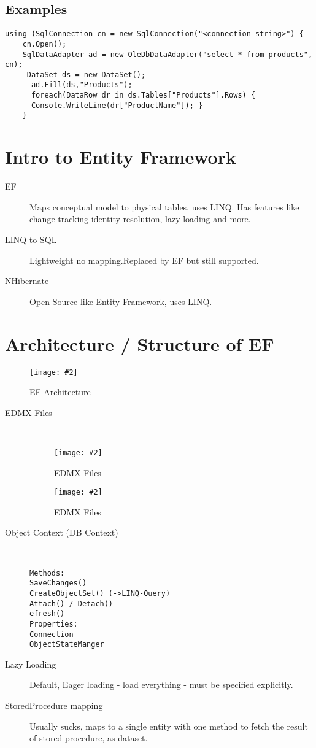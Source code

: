 \documentclass[a4paper,10pt]{scrreprt}
\newcommand{\pic}[2][figure]{\begin{figure}[h]
 \centering
 \texttt{[image: \#2]}
 \caption{#1}
\end{figure}
}
\begin{document}
\subsection{Examples}
\begin{lstlisting}[caption=DataSet Example]
using (SqlConnection cn = new SqlConnection("<connection string>") { 
	cn.Open(); 
	SqlDataAdapter ad = new OleDbDataAdapter("select * from products", cn);
	 DataSet ds = new DataSet();
	  ad.Fill(ds,"Products"); 
	  foreach(DataRow dr in ds.Tables["Products"].Rows) { 
	  Console.WriteLine(dr["ProductName"]); } 
	}
\end{lstlisting}
\section{Intro to Entity Framework}
\begin{description}
\item [EF] Maps conceptual model to physical tables, uses LINQ. Has features like change tracking identity resolution, 
lazy loading and more. 
\item [LINQ to SQL] Lightweight no mapping.Replaced by EF but still supported.
\item [NHibernate] Open Source like Entity Framework, uses LINQ.

\end{description}
\section{Architecture / Structure of EF}
\pic[EF Architecture]{efarch.png}

\begin{description}
\item[EDMX Files] \hfill \\
\pic[EDMX Files]{edmx1.png}
\pic[EDMX Files]{edmx2.png}
\item[Object Context (DB Context)] \hfill \\
\begin{verbatim}
Methods:
SaveChanges()
CreateObjectSet() (->LINQ-Query)
Attach() / Detach()
efresh()
Properties:
Connection
ObjectStateManger
\end{verbatim}
\item[Lazy Loading] Default, Eager loading - load everything - must be specified explicitly.
\item[StoredProcedure mapping] Usually sucks, maps to a single entity with one method to fetch the result of stored 
procedure, as dataset.
\end{description}
\end{document}
